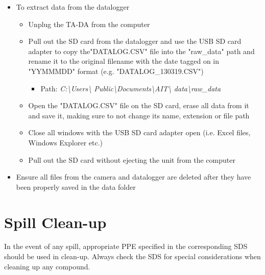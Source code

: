 \documentclass[letterpaper,11pt]{article}
\begin{document}
\begin{itemize}
    \item To extract data from the datalogger
        \begin{itemize}
        \item Unplug the TA-DA from the computer
        \item Pull out the SD card from the datalogger and use the USB SD card 
            adapter to copy the"DATALOG.CSV" file into the "raw\_data" path and 
            rename it to the original filename with the date 
            tagged on in "YYMMMDD" format (e.g. "DATALOG\_130319.CSV")
            \begin{itemize}
            \item Path: \textit{C:\textbackslash Users\textbackslash 
            Public\textbackslash Documents\textbackslash AIT\textbackslash 
            data\textbackslash raw\_data}
            \end{itemize}
        \item Open the "DATALOG.CSV" file on the SD card, erase all data from
            it and save it, making sure to not change its name, extension or 
            file path
        \item Close all windows with the USB SD card adapter open (i.e. Excel 
            files, Windows Explorer etc.)
        \item Pull out the SD card without ejecting the unit from the computer
        \end{itemize}
    
    \item Ensure all files from the camera and datalogger are deleted after they
        have been properly saved in the data folder 
            
    \end{itemize}


\section{Spill Clean-up}
In the event of any spill, appropriate PPE specified in the corresponding SDS 
    should be used in clean-up. Always check the SDS for special considerations
    when cleaning up any compound.
\end{document}
